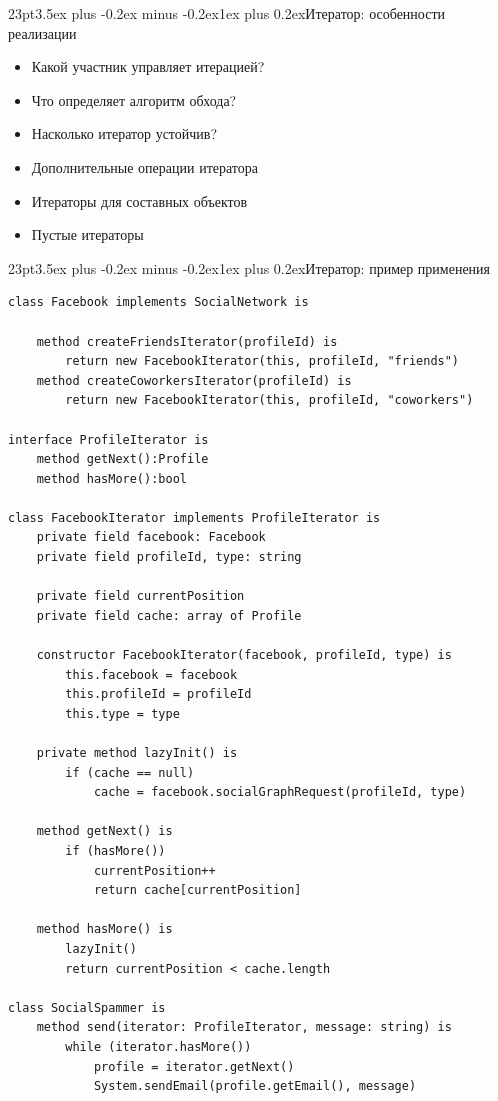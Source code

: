 \documentclass[12pt, a4paper]{book}%
\makeatletter
\renewcommand{\subsection}{\@startsection{subsection}{2}%
{23pt}{3.5ex plus -0.2ex minus -0.2ex}{1ex plus 0.2ex}{\bf}}%
\makeatother
\begin{document}
{\subsection{Итератор: особенности реализации}
\begin{itemize}
    \item Какой участник управляет итерацией?
    \item Что определяет алгоритм обхода?
    \item Насколько итератор устойчив?
    \item Дополнительные операции итератора
    \item Итераторы для составных объектов
    \item Пустые итераторы
\end{itemize}
\subsection{Итератор: пример применения}
\begin{lstlisting}
class Facebook implements SocialNetwork is

    method createFriendsIterator(profileId) is
        return new FacebookIterator(this, profileId, "friends")
    method createCoworkersIterator(profileId) is
        return new FacebookIterator(this, profileId, "coworkers")

interface ProfileIterator is
    method getNext():Profile
    method hasMore():bool

class FacebookIterator implements ProfileIterator is
    private field facebook: Facebook
    private field profileId, type: string

    private field currentPosition
    private field cache: array of Profile

    constructor FacebookIterator(facebook, profileId, type) is
        this.facebook = facebook
        this.profileId = profileId
        this.type = type

    private method lazyInit() is
        if (cache == null)
            cache = facebook.socialGraphRequest(profileId, type)

    method getNext() is
        if (hasMore())
            currentPosition++
            return cache[currentPosition]

    method hasMore() is
        lazyInit()
        return currentPosition < cache.length

class SocialSpammer is
    method send(iterator: ProfileIterator, message: string) is
        while (iterator.hasMore())
            profile = iterator.getNext()
            System.sendEmail(profile.getEmail(), message)


\end{lstlisting}}
\end{document}
